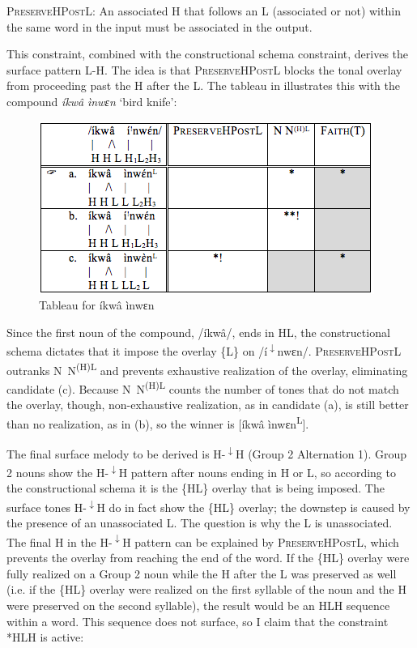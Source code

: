 \documentclass[output=paper]{langscibook}
\begin{document}
\ea \label{ex:glewwe:3}
{\textsc{PreserveHPostL:} An associated H that follows an L (associated or not) within the same word in the input must be associated in the output.} \\
\z

This constraint, combined with the constructional schema constraint, derives the surface pattern L-H. The idea is that \textsc{PreserveHPostL} blocks the tonal overlay from proceeding past the H after the L. The tableau in  illustrates this with the compound \textit{íkwâ} \textit{ìnwɛn} ‘bird knife’: 

  
\begin{figure}
\includegraphics[width=\textwidth]{figures/glewwe-img4.png}
\caption{Tableau for \textup{íkwâ ìnwɛn}}
\label{fig:glewwe:5}
\end{figure}

Since the first noun of the compound, /íkwâ/, ends in HL, the constructional schema dictates that it impose the overlay \{L\} on /í\textsuperscript{$\downarrow$}nwɛn/. \textsc{PreserveHPostL} outranks N~N\textsuperscript{(H)L} and prevents exhaustive realization of the overlay, eliminating candidate (c). Because N~N\textsuperscript{(H)L} counts the number of tones that do not match the overlay, though, non-exhaustive realization, as in candidate (a), is still better than no realization, as in (b), so the winner is [íkwâ ìnwɛn\textsuperscript{L}]. 

The final surface melody to be derived is H-\textsuperscript{$\downarrow$}H (Group 2 Alternation 1). Group 2 nouns show the H-\textsuperscript{$\downarrow$}H pattern after nouns ending in H or L, so according to the constructional schema it is the \{HL\} overlay that is being imposed. The surface tones H-\textsuperscript{$\downarrow$}H do in fact show the \{HL\} overlay; the downstep is caused by the presence of an unassociated L. The question is why the L is unassociated. The final H in the H-\textsuperscript{$\downarrow$}H pattern can be explained by \textsc{PreserveHPostL}, which prevents the overlay from reaching the end of the word. If the \{HL\} overlay were fully realized on a Group 2 noun while the H after the L was preserved as well (i.e. if the \{HL\} overlay were realized on the first syllable of the noun and the H were preserved on the second syllable), the result would be an HLH sequence within a word. This sequence does not surface, so I claim that the constraint *HLH is active:
\end{document}
